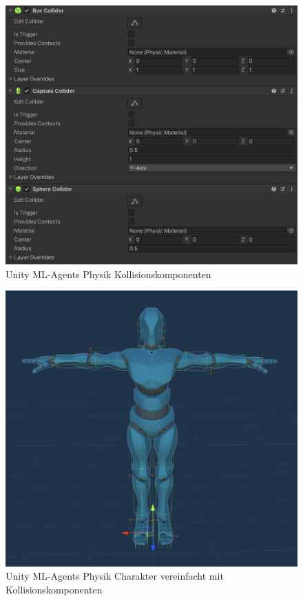  \begin{figure}[H]
  \centering  
  \includegraphics[scale=0.5]{img/physik_kollision.png}
  \caption{Unity ML-Agents Physik Kollisionskomponenten}
  \label{fig:physik_kollision}
\end{figure}

 \begin{figure}[H]
  \centering  
  \includegraphics[scale=0.5]{img/physik_kollision_charakter.png}
  \caption{Unity ML-Agents Physik Charakter vereinfacht mit Kollisionskomponenten }
  \label{fig:physik_kollision_charakter}
\end{figure}

